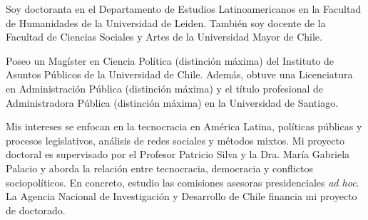 




\par{Soy doctoranta en el Departamento de Estudios Latinoamericanos en la Facultad de Humanidades de la Universidad de Leiden. También soy docente de la Facultad de Ciencias Sociales y Artes de la Universidad Mayor de Chile. 

Poseo un Magíster en Ciencia Política (distinción máxima) del Instituto de Asuntos Públicos de la Universidad de Chile. Además, obtuve una Licenciatura en Administración Pública (distinción máxima) y el título profesional de Administradora Pública (distinción máxima) en la Universidad de Santiago.

Mis intereses se enfocan en la tecnocracia en América Latina, políticas públicas y procesos legislativos, análisis de redes sociales y métodos mixtos. Mi proyecto doctoral es supervisado por el Profesor Patricio Silva y la Dra. María Gabriela Palacio y aborda la relación entre tecnocracia, democracia y conflictos sociopolíticos. En concreto, estudio las comisiones asesoras presidenciales {\itshape ad hoc}. La Agencia Nacional de Investigación y Desarrollo de Chile financia mi proyecto de doctorado.}\\